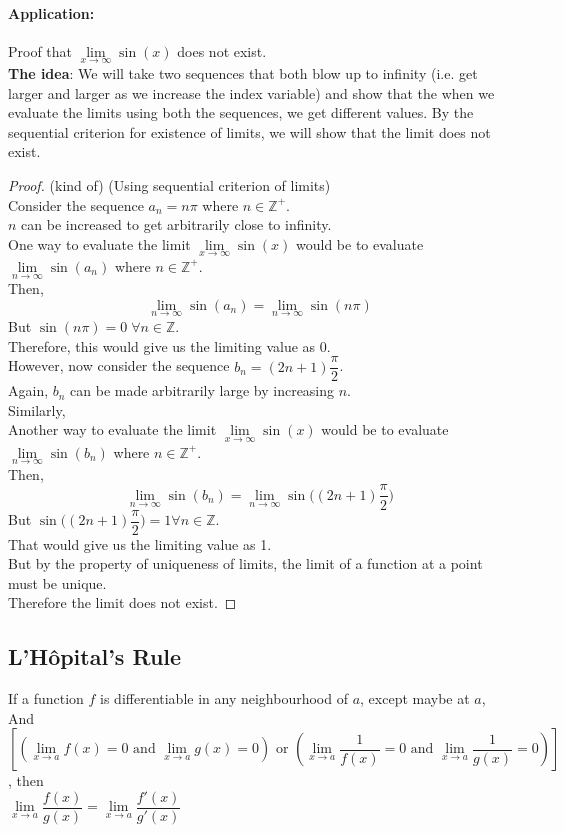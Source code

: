 \documentclass[14]{article}
\theoremstyle{definition}
\theoremstyle{case}
\begin{document}
\paragraph{Application:}
Proof that $\lim\limits_{x \to \infty} \sin(x)$ does not exist.\\
\textbf{The idea}: We will take two sequences that both blow up to infinity (i.e. get larger and larger as we increase the index variable) and show that the when we evaluate the limits using both the sequences, we get different values. By the sequential criterion for existence of limits, we will show that the limit does not exist.
\begin{proof} (kind of) (Using sequential criterion of limits)\\
Consider the sequence $a_n = n \pi$ where $n \in \mathbb{Z^+}$.\\
$n$ can be increased to get arbitrarily close to infinity.\\
One way to evaluate the limit $\lim\limits_{x \to \infty} \sin(x)$ would be to evaluate $\lim\limits_{n \to \infty}\sin(a_n)$ where $n \in \mathbb{Z^+}$.\\
Then,
\[\lim\limits_{n \to \infty}\sin(a_n)= \lim\limits_{n \to \infty} \sin(n\pi)\]
But $\sin(n\pi) = 0\; \forall n \in \mathbb{Z}$.\\
Therefore, this would give us the limiting value as $0$.\\
However, now consider the sequence $b_n = (2n+1)\dfrac{\pi}{2}$.\\
Again, $b_n$ can be made arbitrarily large by increasing $n$.\\
Similarly, \\Another way to evaluate the limit $\lim\limits_{x \to \infty} \sin(x)$ would be to evaluate $\lim\limits_{n \to \infty}\sin(b_n)$ where $n \in \mathbb{Z^+}$.\\
Then,
\[\lim\limits_{n\to \infty} \sin(b_n) = \lim\limits_{n \to \infty} \sin\Big((2n+1)\dfrac{\pi}{2}\Big)\]
But $\sin\Big((2n+1)\dfrac{\pi}{2}\Big) = 1 \forall n \in \mathbb{Z}$.\\
That would give us the limiting value as 1.\\
But by the property of uniqueness of limits, the limit of a function at a point must be unique.\\Therefore the limit does not exist.
\end{proof}
\subsection{L'Hôpital's Rule}
If a function $f$ is differentiable in any neighbourhood of $a$, except maybe at $a$,\\
And $\left[\left(\lim\limits_{x \to a} f(x) = 0 \text{ and }\lim\limits_{x \to a} g(x) = 0\right) \text{ or }\left(\lim\limits_{x \to a}\dfrac{1}{f(x)} = 0 \text{ and }\lim\limits_{x \to a} \dfrac{1}{g(x)} = 0\right)\right]$, then\\
$\lim\limits_{x \to a} \dfrac{f(x)}{g(x)} = \lim\limits_{x \to a} \dfrac{f'(x)}{g'(x)}$
\end{document}
